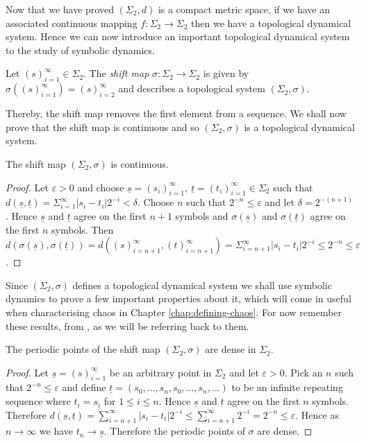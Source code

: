 Now that we have proved $(\Sigma_2, d)$ is a compact metric space, if we have an associated continuous mapping $f: \Sigma_2 \to \Sigma_2$ then we have a topological dynamical system. Hence we can now introduce an important topological dynamical system to the study of symbolic dynamics.

\begin{defn} 
    Let $(s)_{i=1}^{\infty} \in \Sigma_2$. The \emph{shift map} $\sigma: \Sigma_2 \to \Sigma_2$ is given by $\sigma \left((s)_{i=1}^{\infty}\right) = (s)_{i=2}^{\infty}$ and describes a topological system $(\Sigma_2, \sigma)$.
\end{defn}

Thereby, the shift map removes the first element from a sequence. We shall now prove that the shift map is continuous and so $(\Sigma_2, \sigma)$ is a topological dynamical system.

\begin{prop}
    The shift map $(\Sigma_2, \sigma)$ is continuous.
    \begin{proof}
        Let $\varepsilon > 0$ and choose $\underline{s} = (s_i)_{i=1}^{\infty}, \ \underline{t} = (t_i)_{i=1}^{\infty} \in \Sigma_2$ such that $d(\underline{s}, \underline{t}) = \Sigma_{i=1}^{\infty}|s_i - t_i|2^{-i} < \delta$. Choose $n$ such that $2^{-n} \leq \varepsilon$ and let $\delta = 2^{-(n+1)}$. Hence $\underline{s}$ and $\underline{t}$ agree on the first $n+1$ symbols and $\sigma\left(\underline{s}\right)$ and $\sigma\left(\underline{t}\right)$ agree on the first $n$ symbols. Then $d\left( \sigma\left(\underline{s}\right), \sigma\left(\underline{t}\right) \right) = d\left((s)_{i=n+1}^{\infty}, (t)_{i=n+1}^{\infty}\right) = \Sigma_{i=n+1}^{\infty}|s_i - t_i|2^{-i} \leq 2^{-n} \leq \varepsilon$.
    \end{proof}
\end{prop}

Since $(\Sigma_2, \sigma)$ defines a topological dynamical system we shall use symbolic dynamics to prove a few important properties about it, which will come in useful when characterising chaos in Chapter \ref{chap:defining-chaos}. For now remember these results, from \cite[\S 1.6]{devaney}, as we will be referring back to them.

\begin{prop} \label{prop:shift-map-periodic-points-dense}
    The periodic points of the shift map $(\Sigma_2, \sigma)$ are dense in $\Sigma_2$.
    \begin{proof}
        Let $\underline{s} = (s)_{i=1}^{\infty}$ be an arbitrary point in $\Sigma_2$ and let $\varepsilon > 0$. Pick an $n$ such that $2^{-n} \leq \varepsilon$ and define $\underline{t} = (s_0, \dots, s_n, s_0, \dots, s_n, \dots)$ to be an infinite repeating sequence where $t_i = s_i$ for $1 \leq i \leq n$. Hence $\underline{s}$ and $\underline{t}$ agree on the first $n$ symbols. Therefore $d(\underline{s}, \underline{t}) = \sum_{i=n+1}^{\infty}|s_i - t_i|2^{-i} \leq \sum_{i = n+1}^{\infty}2^{-i} = 2^{-n} \leq \varepsilon$. Hence as $n \to \infty$ we have $t_n \to \underline{s}$. Therefore the periodic points of $\sigma$ are dense.
    \end{proof}
\end{prop}

